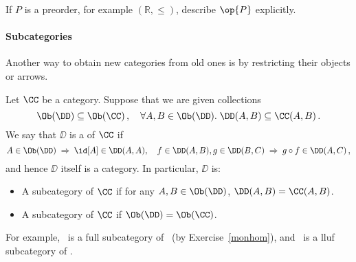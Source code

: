 \documentclass{svmult}
\begin{document}
\begin{myexercise}
If $P$ is a preorder, for example $(\mathbb{R}, \leq )$, describe $\op{P}$ explicitly.
\end{myexercise}

\paragraph{Subcategories} Another way to obtain new categories from old ones is by restricting their objects or arrows.

\begin{mydefinition}
Let $\CC$ be a category. Suppose that we are given collections
\[ \Ob(\DD)\subseteq \Ob(\CC)\,,\quad\forall A,B\in \Ob(\DD).\; \DD(A,B)\subseteq\CC(A,B)\,. \]
We say that $\DD$ is a  of $\CC$ if
\[ A \in \Ob(\DD) \; \Rightarrow \; \id[A] \in \DD(A, A), \quad f \in \DD(A, B), g  \in \DD(B, C) \; \Rightarrow \; g \circ f \in \DD(A, C) \, , \]
and hence $\DD$ itself is a category.
In particular, $\DD$ is:
\begin{itemize}
  \item A  subcategory of $\CC$ if  for any $A,B\in \Ob(\DD)$, $\DD(A,B)=\CC(A,B)$.
  \item A  subcategory of $\CC$ if $\Ob(\DD)=\Ob(\CC)$. \deq
\end{itemize}
\end{mydefinition}
For example, \Grp\ is a full subcategory of \Mon\ (by Exercise~\ref{monhom}), and \Set\ is a lluf subcategory of \Rel.
\end{document}
